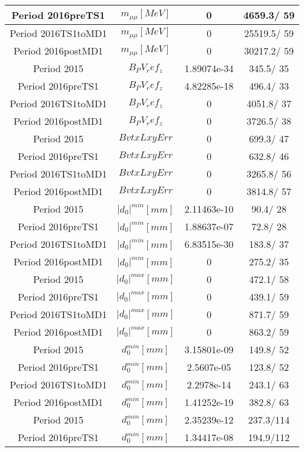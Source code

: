 \documentclass{article}
\begin{document}
\begin{longtable}{c|c|c|c}
\hline
 Period 2016preTS1 & $m_{\mu\mu} [MeV]$ & 0 & 4659.3/ 59\\
\hline
 Period 2016TS1toMD1 & $m_{\mu\mu} [MeV]$ & 0 & 25519.5/ 59\\
\hline
 Period 2016postMD1 & $m_{\mu\mu} [MeV]$ & 0 & 30217.2/ 59\\
\hline
 Period 2015 & $B_PV_ref_z$ & 1.89074e-34 & 345.5/ 35\\
\hline
 Period 2016preTS1 & $B_PV_ref_z$ & 4.82285e-18 & 496.4/ 33\\
\hline
 Period 2016TS1toMD1 & $B_PV_ref_z$ & 0 & 4051.8/ 37\\
\hline
 Period 2016postMD1 & $B_PV_ref_z$ & 0 & 3726.5/ 38\\
\hline
 Period 2015 & $BvtxLxyErr$ & 0 & 699.3/ 47\\
\hline
 Period 2016preTS1 & $BvtxLxyErr$ & 0 & 632.8/ 46\\
\hline
 Period 2016TS1toMD1 & $BvtxLxyErr$ & 0 & 3265.8/ 56\\
\hline
 Period 2016postMD1 & $BvtxLxyErr$ & 0 & 3814.8/ 57\\
\hline
 Period 2015 & $|d_{0}|^{min} [mm]$ & 2.11463e-10 &  90.4/ 28\\
\hline
 Period 2016preTS1 & $|d_{0}|^{min} [mm]$ & 1.88637e-07 &  72.8/ 28\\
\hline
 Period 2016TS1toMD1 & $|d_{0}|^{min} [mm]$ & 6.83515e-30 & 183.8/ 37\\
\hline
 Period 2016postMD1 & $|d_{0}|^{min} [mm]$ & 0 & 275.2/ 35\\
\hline
 Period 2015 & $|d_{0}|^{max} [mm]$ & 0 & 472.1/ 58\\
\hline
 Period 2016preTS1 & $|d_{0}|^{max} [mm]$ & 0 & 439.1/ 59\\
\hline
 Period 2016TS1toMD1 & $|d_{0}|^{max} [mm]$ & 0 & 871.7/ 59\\
\hline
 Period 2016postMD1 & $|d_{0}|^{max} [mm]$ & 0 & 863.2/ 59\\
\hline
 Period 2015 & $d_{0}^{min} [mm]$ & 3.15801e-09 & 149.8/ 52\\
\hline
 Period 2016preTS1 & $d_{0}^{min} [mm]$ & 2.5607e-05 & 123.8/ 52\\
\hline
 Period 2016TS1toMD1 & $d_{0}^{min} [mm]$ & 2.2978e-14 & 243.1/ 63\\
\hline
 Period 2016postMD1 & $d_{0}^{min} [mm]$ & 1.41252e-19 & 382.8/ 63\\
\hline
 Period 2015 & $d_{0}^{min} [mm]$ & 2.35239e-12 & 237.3/114\\
\hline
 Period 2016preTS1 & $d_{0}^{min} [mm]$ & 1.34417e-08 & 194.9/112\\

\end{longtable}
\end{document}
